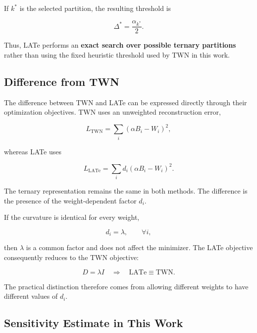 \documentclass[conference]{IEEEtran}
\begin{document}
If $k^*$ is the selected partition, the resulting threshold is

\begin{equation}
\Delta^*
=
\frac{\alpha_{k^*}}{2}.
\end{equation}

Thus, LATe performs an \textbf{exact search over possible ternary
partitions} rather than using the fixed heuristic threshold used by
TWN in this work.

\subsection{Difference from TWN}

The difference between TWN and LATe can be expressed directly through
their optimization objectives. TWN uses an unweighted reconstruction
error,

\begin{equation}
L_{\mathrm{TWN}}
=
\sum_i
(\alpha B_i-W_i)^2,
\end{equation}

whereas LATe uses

\begin{equation}
L_{\mathrm{LATe}}
=
\sum_i
d_i(\alpha B_i-W_i)^2.
\end{equation}

The ternary representation remains the same in both methods. The
difference is the presence of the weight-dependent factor $d_i$.

If the curvature is identical for every weight,

\begin{equation}
d_i=\lambda,
\qquad \forall i,
\end{equation}

then $\lambda$ is a common factor and does not affect the minimizer.
The LATe objective consequently reduces to the TWN objective:

\begin{equation}
D=\lambda I
\quad\Longrightarrow\quad
\mathrm{LATe}\equiv\mathrm{TWN}.
\end{equation}

The practical distinction therefore comes from allowing different
weights to have different values of $d_i$.

\subsection{Sensitivity Estimate in This Work}
\end{document}
